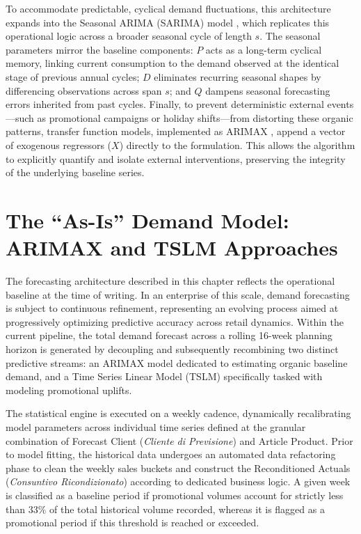 To accommodate predictable, cyclical demand fluctuations, this architecture expands into the Seasonal ARIMA (SARIMA) model \cite{box1970time}, 
which replicates this operational logic across a broader seasonal cycle of length $s$. The seasonal parameters mirror the baseline components: 
$P$ acts as a long-term cyclical memory, linking current consumption to the demand observed at the identical stage of previous annual cycles; 
$D$ eliminates recurring seasonal shapes by differencing observations across span $s$; and $Q$ dampens seasonal forecasting errors inherited from past cycles. 
Finally, to prevent deterministic external events---such as promotional campaigns or holiday shifts---from distorting these organic patterns, transfer function models, 
implemented as ARIMAX \cite{box1970time}, append a vector of exogenous regressors ($X$) directly to the formulation. This allows the algorithm to explicitly quantify 
and isolate external interventions, preserving the integrity of the underlying baseline series.

\section{The ``As-Is'' Demand Model: ARIMAX and TSLM Approaches}

The forecasting architecture described in this chapter reflects the operational baseline at the time of writing. 
In an enterprise of this scale, demand forecasting is subject to continuous refinement, representing an evolving process aimed at progressively optimizing 
predictive accuracy across retail dynamics. Within the current pipeline, the total demand forecast across a rolling 16-week planning horizon is generated by 
decoupling and subsequently recombining two distinct predictive streams: an ARIMAX model dedicated to estimating organic baseline demand, 
and a Time Series Linear Model (TSLM) specifically tasked with modeling promotional uplifts.

The statistical engine is executed on a weekly cadence, dynamically recalibrating model parameters across individual time series defined at the granular 
combination of Forecast Client (\textit{Cliente di Previsione}) and Article Product. 
Prior to model fitting, the historical data undergoes an automated data refactoring phase to clean the weekly sales buckets and construct the 
Reconditioned Actuals (\textit{Consuntivo Ricondizionato}) according to dedicated business logic. 
A given week is classified as a baseline period if promotional volumes account for strictly less than $33\%$ of the total historical volume recorded, 
whereas it is flagged as a promotional period if this threshold is reached or exceeded. 

